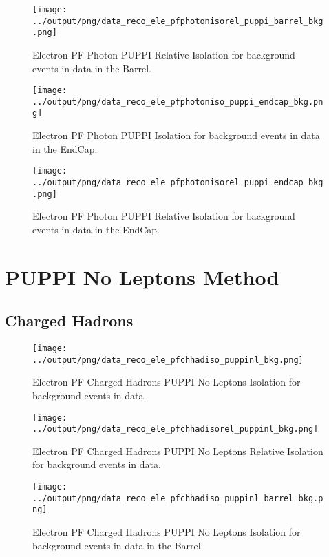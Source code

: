 \documentclass[11pt]{book}
\begin{document}
\begin{figure}[htb]
\centering
\texttt{[image: ../output/png/data\_reco\_ele\_pfphotonisorel\_puppi\_barrel\_bkg.png]}
\caption{Electron PF Photon PUPPI Relative Isolation for background events in data in the Barrel.}
\label{fig:data_ele_pfphotonisorel_puppi_barrel_bkg}
\end{figure}

\begin{figure}[htb]
\centering
\texttt{[image: ../output/png/data\_reco\_ele\_pfphotoniso\_puppi\_endcap\_bkg.png]}
\caption{Electron PF Photon PUPPI Isolation for background events in data in the EndCap.}
\label{fig:data_ele_pfphotoniso_puppi_endcap_bkg}
\end{figure}

\begin{figure}[htb]
\centering
\texttt{[image: ../output/png/data\_reco\_ele\_pfphotonisorel\_puppi\_endcap\_bkg.png]}
\caption{Electron PF Photon PUPPI Relative Isolation for background events in data in the EndCap.}
\label{fig:data_ele_pfphotonisorel_puppi_endcap_bkg}
\end{figure}
\clearpage

\section{PUPPI No Leptons Method}
\subsection{Charged Hadrons}
\begin{figure}[htb]
\centering
\texttt{[image: ../output/png/data\_reco\_ele\_pfchhadiso\_puppinl\_bkg.png]}
\caption{Electron PF Charged Hadrons PUPPI No Leptons Isolation for background events in data.}
\label{fig:data_ele_pfchhadiso_puppinl_bkg}
\end{figure}

\begin{figure}[htb]
\centering
\texttt{[image: ../output/png/data\_reco\_ele\_pfchhadisorel\_puppinl\_bkg.png]}
\caption{Electron PF Charged Hadrons PUPPI No Leptons Relative Isolation for background events in data.}
\label{fig:data_ele_pfchhadisorel_puppinl_bkg}
\end{figure}

\begin{figure}[htb]
\centering
\texttt{[image: ../output/png/data\_reco\_ele\_pfchhadiso\_puppinl\_barrel\_bkg.png]}
\caption{Electron PF Charged Hadrons PUPPI No Leptons Isolation for background events in data in the Barrel.}
\label{fig:data_ele_pfchhadiso_puppinl_barrel_bkg}
\end{figure}
\end{document}
